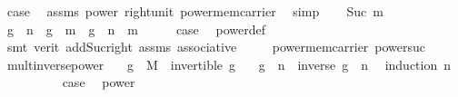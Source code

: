 \begin{isabellebody}
\ {\isacharquery}{\kern0pt}case\ \isamarkupfalse%
\ assms\ power{}\ right{\isacharunderscore}{\kern0pt}unit\ power{\isacharunderscore}{\kern0pt}mem{\isacharunderscore}{\kern0pt}carrier\ \isamarkupfalse%
\ simp\isanewline
{}\isamarkupfalse%
\isanewline
\ \ \isamarkupfalse%
\ {\isacharparenleft}{\kern0pt}Suc\ m{\isacharparenright}{\kern0pt}\isanewline
\ \ \isamarkupfalse%
\ {\isachardoublequoteopen}g\ {\isacharcircum}{\kern0pt}\ n\ {\isasymcdot}\ g\ {\isacharcircum}{\kern0pt}\ m\ {\isacharequal}{\kern0pt}\ g\ {\isacharcircum}{\kern0pt}\ {\isacharparenleft}{\kern0pt}n\ {\isacharplus}{\kern0pt}\ m{\isacharparenright}{\kern0pt}{\isachardoublequoteclose}\isanewline
\ \ \isamarkupfalse%
\ \isamarkupfalse%
\ {\isacharquery}{\kern0pt}case\ \isamarkupfalse%
\ power{\isacharunderscore}{\kern0pt}def\ \isamarkupfalse%
\ {\isacharparenleft}{\kern0pt}smt\ {\isacharparenleft}{\kern0pt}verit{\isacharparenright}{\kern0pt}\ add{\isacharunderscore}{\kern0pt}Suc{\isacharunderscore}{\kern0pt}right\ assms\ associative\ \isanewline
\ \ \ \ power{\isacharunderscore}{\kern0pt}mem{\isacharunderscore}{\kern0pt}carrier\ power{\isacharunderscore}{\kern0pt}suc{\isacharparenright}{\kern0pt}\isanewline
{}\isamarkupfalse%
%
\endisatagproof
{\isafoldproof}%
%
\isadelimproof
\isanewline
%
\endisadelimproof
\isanewline
{}\isamarkupfalse%
\ mult{\isacharunderscore}{\kern0pt}inverse{\isacharunderscore}{\kern0pt}power{\isacharcolon}{\kern0pt}\isanewline
\ \ \ {\isachardoublequoteopen}g\ {\isasymin}\ M{\isachardoublequoteclose}\ \ {\isachardoublequoteopen}invertible\ g{\isachardoublequoteclose}\isanewline
\ \ \ {\isachardoublequoteopen}g\ {\isacharcircum}{\kern0pt}\ n\ {\isasymcdot}\ {\isacharparenleft}{\kern0pt}{\isacharparenleft}{\kern0pt}inverse\ g{\isacharparenright}{\kern0pt}\ {\isacharcircum}{\kern0pt}\ n{\isacharparenright}{\kern0pt}\ {\isacharequal}{\kern0pt}\ {\isasymone}{\isachardoublequoteclose}\isanewline
%
\isadelimproof
%
\endisadelimproof
%
\isatagproof
{}\isamarkupfalse%
{\isacharparenleft}{\kern0pt}induction\ n{\isacharparenright}{\kern0pt}\isanewline
\ \ \isamarkupfalse%
\ {}\isanewline
\ \ \isamarkupfalse%
\ \isamarkupfalse%
\ {\isacharquery}{\kern0pt}case\ \isamarkupfalse%
\ power{\isacharunderscore}{\kern0pt}{}\ \isamarkupfalse%

\end{isabellebody}
